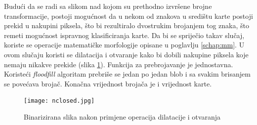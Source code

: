 \documentclass[times, zavrsni, numeric, utf8]{fer}
\begin{document}
Budući da se radi sa slikom nad kojom su prethodno izvršene brojne transformacije, postoji mogućnost da u nekom od znakova u središtu karte postoji prekid u nakupini piksela, što bi rezultiralo dvostrukim brojanjem tog znaka, što remeti mogućnost ispravnog klasificiranja karte. Da bi se spriječio takav slučaj, koriste se operacije matematičke morfologije opisane u poglavlju \ref{schap:mm}. U ovom slučaju koristi se dilatacija i otvaranje kako bi dobili nakupine piksela koje nemaju nikakve prekide (slika \ref{fig:dilandopen}). Funkcija za prebrojavanje je jednostavna. Koristeći \textit{floodfill} algoritam prebriše se jedan po jedan blob i sa svakim brisanjem se povećava brojač. Konačna vrijednost brojača je i vrijednost karte.
\begin{figure}[H]
\centering
\texttt{[image: nclosed.jpg]}
\caption{Binarizirana slika nakon primjene operacija dilatacije i otvaranja}
\label{fig:dilandopen}
\end{figure}
\end{document}
